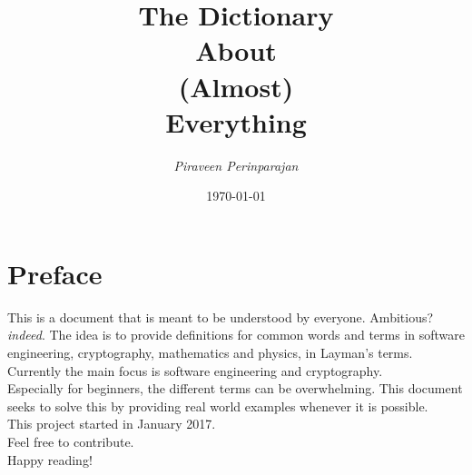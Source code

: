 \documentclass[12pt]{report}
\begin{document}
\begin{titlepage}
\title{\textbf{The Dictionary \\ About \\ (Almost) \\ Everything} }
\author{\textit{Piraveen Perinparajan}}
\date{\monthyeardate\today}
\end{titlepage}
\maketitle



\chapter*{Preface}  %
This is a document that is meant to be understood by everyone. Ambitious? \textit{indeed}. The idea is to provide definitions for common words and terms in software engineering, cryptography, mathematics and physics, in Layman's terms. Currently the main focus is software engineering and cryptography. \\

\noindent Especially for beginners, the different terms can be overwhelming. This document seeks to solve this by providing real world examples whenever it is possible. \\

\noindent This project started in January 2017. \\
\noindent Feel free to contribute.\\

\noindent Happy reading!


\clearpage
    \tableofcontents
\clearpage


\printglossary[title=Acronyms,type=\acronymtype]   %
\printglossary
\end{document}
